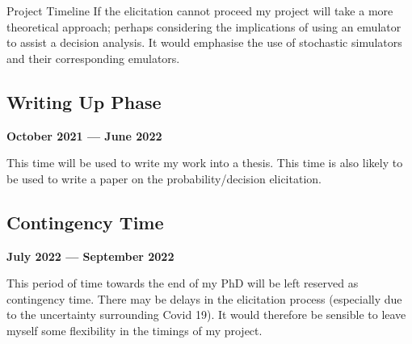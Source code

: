 \begin{chapter}{Project Timeline}
If the elicitation cannot proceed my project will take a more theoretical approach; perhaps considering the implications of using an emulator to assist a decision analysis. It would emphasise the use of stochastic simulators and their corresponding emulators.

\subsection{Writing Up Phase}

\textbf{October 2021 --- June 2022} 

This time will be used to write my work into a thesis. This time is also likely to be used to write a paper on the probability/decision elicitation.

\subsection{Contingency Time}

\textbf{July 2022 --- September 2022} 

This period of time towards the end of my PhD will be left reserved as contingency time. There may be delays in the elicitation process (especially due to the uncertainty surrounding Covid 19). It would therefore be sensible to leave myself some flexibility in the timings of my project.
\end{chapter}
